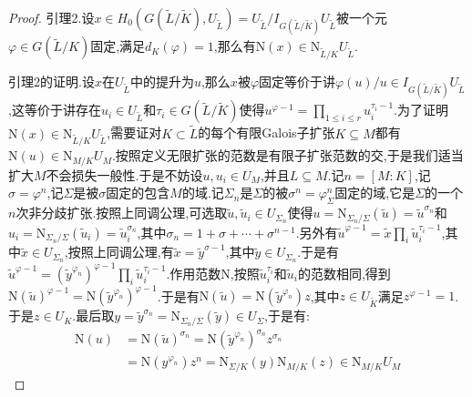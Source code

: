 \begin{enumerate}
\begin{proof}
    	引理2.设$x\in H_0(G(\widetilde{L}/\widetilde{K}),U_{\widetilde{L}})=U_{\widetilde{L}}/I_{G(\widetilde{L}/\widetilde{K})}U_{\widetilde{L}}$被一个元$\varphi\in G(\widetilde{L}/K)$固定,满足$d_K(\varphi)=1$,那么有$\mathrm{N}(x)\in\mathrm{N}_{\widetilde{L}/K}U_{\widetilde{L}}$.
    	
    	引理2的证明.设$x$在$U_{\widetilde{L}}$中的提升为$u$,那么$x$被$\varphi$固定等价于讲$\varphi(u)/u\in I_{G(\widetilde{L}/\widetilde{K})}U_{\widetilde{L}}$,这等价于讲存在$u_i\in U_{\widetilde{L}}$和$\tau_i\in G(\widetilde{L}/\widetilde{K})$使得$u^{\varphi-1}=\prod_{1\le i\le r}u_i^{\tau_i-1}$.为了证明$\mathrm{N}(x)\in\mathrm{N}_{\widetilde{L}/K}U_{\widetilde{L}}$,需要证对$K\subset\widetilde{L}$的每个有限Galois子扩张$K\subseteq M$都有$\mathrm{N}(u)\in\mathrm{N}_{M/K}U_M$.按照定义无限扩张的范数是有限子扩张范数的交,于是我们适当扩大$M$不会损失一般性.于是不妨设$u,u_i\in U_M$,并且$L\subseteq M$.记$n=[M:K]$,记$\sigma=\varphi^n$,记$\Sigma$是被$\sigma$固定的包含$M$的域.记$\Sigma_n$是$\Sigma$的被$\sigma^n=\varphi^n_{\Sigma}$固定的域,它是$\Sigma$的一个$n$次非分歧扩张.按照上同调公理,可选取$\widetilde{u},\widetilde{u}_i\in U_{\Sigma_n}$使得$u=\mathrm{N}_{\Sigma_n/\Sigma}(\widetilde{u})=\widetilde{u}^{\sigma_n}$和$u_i=\mathrm{N}_{\Sigma_n/\Sigma}(\widetilde{u}_i)=\widetilde{u}_i^{\sigma_n}$,其中$\sigma_n=1+\sigma+\cdots+\sigma^{n-1}$.另外有$\widetilde{u}^{\varphi-1}=\widetilde{x}\prod_i\widetilde{u}_i^{\tau_i-1}$,其中$\widetilde{x}\in U_{\Sigma_n}$,按照上同调公理,有$\widetilde{x}=\widetilde{y}^{\sigma-1}$,其中$\widetilde{y}\in U_{\Sigma_n}$.于是有$\widetilde{u}^{\varphi-1}=(\widetilde{y}^{\varphi_n})^{\varphi-1}\prod_i\widetilde{u}_i^{\tau_i-1}$.作用范数$\mathrm{N}$,按照$\widetilde{u}_i^{\tau_i}$和$\widetilde{u}_i$的范数相同,得到$\mathrm{N}(\widetilde{u})^{\varphi-1}=\mathrm{N}(\widetilde{y}^{\varphi_n})^{\varphi-1}$.于是有$\mathrm{N}(\widetilde{u})=\mathrm{N}(\widetilde{y}^{\varphi_n})z$,其中$z\in U_{\widetilde{K}}$满足$z^{\varphi-1}=1$.于是$z\in U_K$.最后取$y=\widetilde{y}^{\sigma_n}=\mathrm{N}_{\Sigma_n/\Sigma}(\widetilde{y})\in U_{\Sigma}$,于是有:
    	\begin{align*}
    	\mathrm{N}(u)&=\mathrm{N}(\widetilde{u})^{\sigma_n}=\mathrm{N}(\widetilde{y}^{\varphi_n})^{\sigma_n}z^{\sigma_n}\\&=\mathrm{N}(y^{\varphi_n})z^n=\mathrm{N}_{\Sigma/K}(y)\mathrm{N}_{M/K}(z)\in\mathrm{N}_{M/K}U_M
    	\end{align*}
    	

\end{proof}
\end{enumerate}
